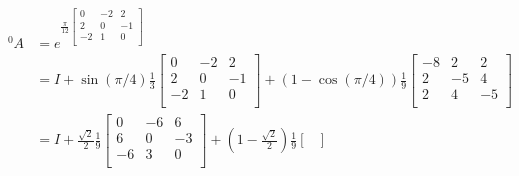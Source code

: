 \begin{solutionbox}[Q1-2]
    \begin{align*}
        {\,^0A} & =e^{\frac{\pi}{12} \begin{bmatrix}
                                         0  & -2 & 2  \\
                                         2  & 0  & -1 \\
                                         -2 & 1  & 0  \\
                                     \end{bmatrix}}                                                                                                                                                                                                                                                                        \\
                & =I
        +\sin(\pi/4)\frac{1}{3}\begin{bmatrix}
                                   0  & -2 & 2  \\
                                   2  & 0  & -1 \\
                                   -2 & 1  & 0  \\
                               \end{bmatrix}
        +(1-\cos(\pi/4))\frac{1}{9}\begin{bmatrix}
                                       -8 & 2  & 2  \\
                                       2  & -5 & 4  \\
                                       2  & 4  & -5 \\
                                   \end{bmatrix}                                                                                                                                                                                                                                                                          \\
                & =I
        +\frac{\sqrt{2}}{2}\frac{1}{9}\begin{bmatrix}
                                          0  & -6 & 6  \\
                                          6  & 0  & -3 \\
                                          -6 & 3  & 0  \\
                                      \end{bmatrix}
        +(1-\frac{\sqrt{2}}{2})\frac{1}{9}\begin{bmatrix}

\end{bmatrix}
\end{align*}
\end{solutionbox}
